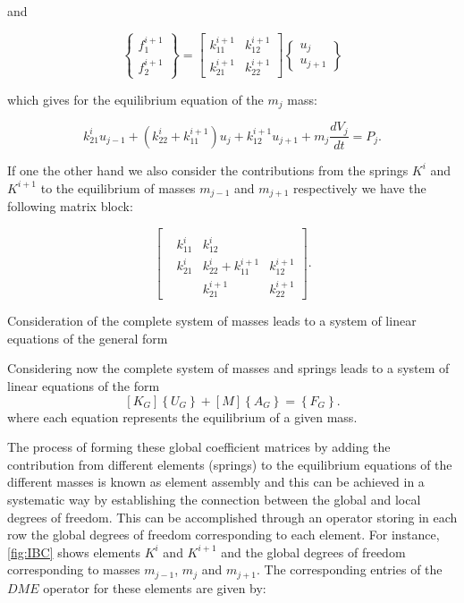 and

\[\left\{ {\begin{array}{*{20}{c}}
{f_1^{i + 1}}\\
{f_2^{i + 1}}
\end{array}} \right\} = \left[ {\begin{array}{*{20}{c}}
{k_{11}^{i + 1}}&{k_{12}^{i + 1}}\\
{k_{21}^{i + 1}}&{k_{22}^{i + 1}}
\end{array}} \right]\left\{ {\begin{array}{*{20}{c}}
{{u_j}}\\
{{u_{j + 1}}}
\end{array}} \right\}\]

which gives for the equilibrium equation of the $m_j$ mass:

\[k_{21}^i{u_{j - 1}} + (k_{22}^i + k_{11}^{i + 1}){u_j} + k_{12}^{i + 1}{u_{j + 1}} + {m_j}\frac{{d{V_j}}}{{dt}} = {P_j}.\]

If one the other hand we also consider the contributions from the springs $K^i$ and $K^{i+1}$ to the equilibrium of masses $m_{j-1}$ and $m_{j+1}$ respectively we have the following matrix block:



\[\left[ {\begin{array}{*{20}{c}}
{}&{}&{}&{}\\
{}&{k_{11}^i}&{k_{12}^i}&{}\\
{}&{k_{21}^i}&{k_{22}^i + k_{11}^{i + 1}}&{k_{12}^{i + 1}}\\
{}&{}&{k_{21}^{i + 1}}&{k_{22}^{i + 1}}
\end{array}} \right].\]

Consideration of the complete system of masses leads to a system of linear equations of the general form


Considering now the complete system of masses and springs leads to a system of linear equations of the form
\begin{equation}
\left[ {{K_G}} \right]\left\{ {{U_G}} \right\} + \left[ M \right]\left\{ {{A_G}} \right\} = \left\{ {{F_G}} \right\}.
\label{eq:global}
\end{equation}
where each equation represents the equilibrium of a given mass.

The process of forming these global coefficient matrices by adding the contribution from different elements (springs) to the equilibrium equations of the different masses is known as element assembly and this can be achieved in a systematic way by establishing the connection between the global and local degrees of freedom. This can be accomplished through an operator storing in each row the global degrees of freedom corresponding to each element. For instance, \cref{fig:IBC} shows elements $K^i$ and $K^{i+1}$ and the global degrees of freedom corresponding to masses $m_{j-1}$, $m_j$ and $m_{j+1}$. The corresponding entries of the $DME$ operator for these elements are given by:


